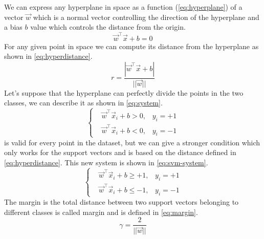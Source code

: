 We can express any hyperplane in space as a function (\cref{eq:hyperplane}) of a vector $\vec{w}$ which is a normal vector
controlling the direction of the hyperplane and a bias $b$ value which controls the distance from
the origin.
\begin{equation}
	\label{eq:hyperplane}
	\vec{w}^\top\vec{x} + b = 0
\end{equation}
For any given point in space we can compute its distance from the hyperplane as shown in
\cref{eq:hyperdistance}.
\begin{equation}
	\label{eq:hyperdistance}
	r = \frac{|\vec{w}^\top\vec{x} + b|}{||\vec{w}||}
\end{equation}
Let's suppose that the hyperplane can perfectly divide the points in the two classes, we can
describe it as shown in \cref{eq:system}.
\begin{equation}
	\label{eq:system}
	\begin{cases}
		 & \vec{w}^\top\vec{x}_i + b > 0, \hspace{10pt} y_i = +1 \\
		 & \vec{w}^\top\vec{x}_i + b < 0, \hspace{10pt} y_i = -1
	\end{cases}
\end{equation}
 is valid for every point in the dataset, but we can give a stronger condition
which only works for the support vectors and is based on the distance defined in
\cref{eq:hyperdistance}. This new system is shown in \cref{eq:svm-system}.
\begin{equation}
	\label{eq:svm-system}
	\begin{cases}
		 & \vec{w}^\top\vec{x}_i + b \geq +1, \hspace{10pt} y_i = +1 \\
		 & \vec{w}^\top\vec{x}_i + b \leq -1, \hspace{10pt} y_i = -1
	\end{cases}
\end{equation}
The margin is the total distance between two support vectors belonging to different classes is
called margin and is defined in \cref{eq:margin}.
\begin{equation}
	\label{eq:margin}
	\gamma = \frac{2}{||\vec{w}||}
\end{equation}

\medskip

